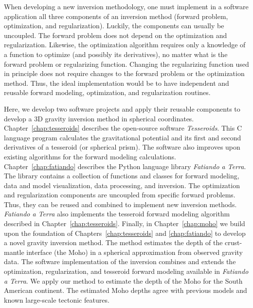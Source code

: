 When developing a new inversion methodology, one must implement in a software
application all three components of an inversion method (forward problem,
optimization, and regularization).
Luckily, the components can usually be uncoupled.
The forward problem does not depend on the optimization and regularization.
Likewise, the optimization algorithm requires only a knowledge of a function to
optimize (and possibly its derivatives), no matter what is the forward problem
or regularizing function.
Changing the regularizing function used in principle does not require changes
to the forward problem or the optimization method.
Thus, the ideal implementation would be to have independent and reusable
forward modeling, optimization, and regularization routines.

Here, we develop two software projects and apply their reusable components to
develop a 3D gravity inversion method in spherical coordinates.
Chapter~\ref{chap:tesseroids} describes the open-source software
\textit{Tesseroids}.
This C language program calculates the gravitational potential and its first
and second derivatives of a tesseroid (or spherical prism).
The software also improves upon existing algorithms for the forward modeling
calculations.
Chapter~\ref{chap:fatiando} describes the Python language library
\textit{Fatiando a Terra}.
The library contains a collection of functions and classes for forward
modeling, data and model visualization, data processing, and inversion.
The optimization and regularization components are uncoupled from specific
forward problems.
Thus, they can be reused and combined to implement new inversion methods.
\textit{Fatiando a Terra} also implements the tesseroid forward modeling
algorithm described in Chapter~\ref{chap:tesseroids}.
Finally, in Chapter~\ref{chap:moho} we build upon the foundation of
Chapters~\ref{chap:tesseroids} and \ref{chap:fatiando} to develop a novel
gravity inversion method.
The method estimates the depth of the crust-mantle interface (the Moho) in a
spherical approximation from observed gravity data.
The software implementation of the inversion combines and extends the
optimization, regularization, and tesseroid forward modeling available in
\textit{Fatiando a Terra}.
We apply our method to estimate the depth of the Moho for the South American
continent.
The estimated Moho depths agree with previous models and known large-scale
tectonic features.
